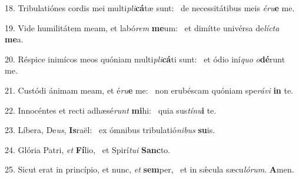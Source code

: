 18. Tribulatiónes cordis mei multi\textit{pli}\textbf{cá}tæ sunt: \ast\  de necessitátibus meis \textit{é}\textit{ru}\textbf{e} me.\

19. Vide humilitátem meam, et labó\textit{rem} \textbf{me}um: \ast\  et dimítte univérsa de\textit{líc}\textit{ta} \textbf{me}a.\

20. Réspice inimícos meos quóniam multi\textit{pli}\textbf{cá}ti sunt: \ast\  et ódio iní\textit{quo} \textit{o}\textbf{dé}runt me.\

21. Custódi ánimam meam, et é\textit{ru}\textbf{e} me: \ast\  non erubéscam quóniam spe\textit{rá}\textit{vi} \textbf{in} te.\

22. Innocéntes et recti adhæsé\textit{runt} \textbf{mi}hi: \ast\  quia sus\textit{tí}\textit{nu}\textbf{i} te.\

23. Líbera, De\textit{us}, \textbf{Is}raël: \ast\  ex ómnibus tribulatió\textit{ni}\textit{bus} \textbf{su}is.\

24. Glória Patri, \textit{et} \textbf{Fí}lio, \ast\  et Spirí\textit{tu}\textit{i} \textbf{Sanc}to.\

25. Sicut erat in princípio, et nunc, \textit{et} \textbf{sem}per, \ast\  et in sǽcula sæcu\textit{ló}\textit{rum}. \textbf{A}men.\

